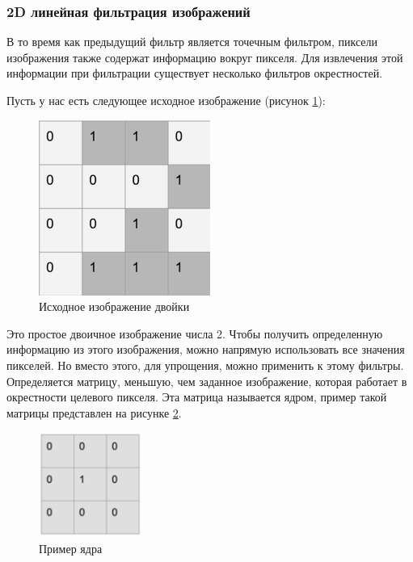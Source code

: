 \subsubsection{2D линейная фильтрация изображений}

В то время как предыдущий фильтр является точечным фильтром, пиксели изображения также содержат информацию вокруг пикселя. Для извлечения этой информации при фильтрации существует несколько фильтров окрестностей.

Пусть у нас есть следующее исходное изображение (рисунок \ref{fig:spire02}):
\begin{figure}[hbtp]
	\centering
	\includegraphics[width=0.5\textwidth]{img/image2.png}
	\caption{\label{fig:spire02} Исходное изображение двойки}
\end{figure}

Это простое двоичное изображение числа 2. Чтобы получить определенную информацию из этого изображения, можно напрямую использовать все значения пикселей. Но вместо этого, для упрощения, можно применить к этому фильтры. Определяется матрицу, меньшую, чем заданное изображение, которая работает в окрестности целевого пикселя. Эта матрица называется ядром, пример такой матрицы представлен на рисунке \ref{fig:spire03}.

\begin{figure}[hbtp]
	\centering
	\includegraphics[width=0.3\textwidth]{img/image3.png}
	\caption{\label{fig:spire03} Пример ядра}
\end{figure}


